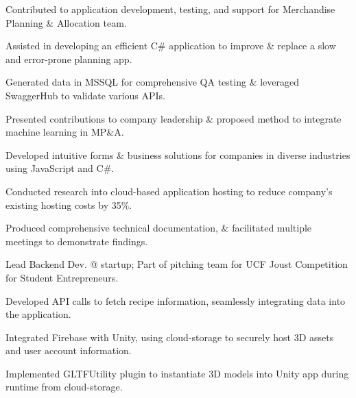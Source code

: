 \documentclass[]{deedy-resume-openfont}
\begin{document}
\begin{tightemize}
\item Contributed to application development, testing, and support for Merchandise Planning \& Allocation team.
\item  Assisted in developing an efficient C\# application to improve \& replace a slow and error-prone planning app. 
\item  Generated data in MSSQL for comprehensive QA testing \& leveraged SwaggerHub to validate various APIs.
\item Presented contributions to company leadership \& proposed method to integrate machine learning in MP\&A.

\end{tightemize}
\sectionsep

\begin{tightemize}
\item Developed intuitive forms \& business solutions for companies in diverse industries using JavaScript and C\#.
\item Conducted research into cloud-based application hosting to reduce company's existing hosting costs by 35\%.
\item Produced comprehensive technical documentation, \& facilitated multiple meetings to demonstrate findings.
\end{tightemize}



\begin{tightemize}
\item Lead Backend Dev. @ startup; Part of pitching team for UCF Joust Competition for Student Entrepreneurs. 
\item Developed API calls to fetch recipe information, seamlessly integrating data into the application.
\item Integrated Firebase with Unity, using cloud-storage to securely host 3D assets and user account information.
\item Implemented GLTFUtility plugin to instantiate 3D models into Unity app during runtime from cloud-storage.
\end{tightemize}
\vspace{8pt}
\end{document}
